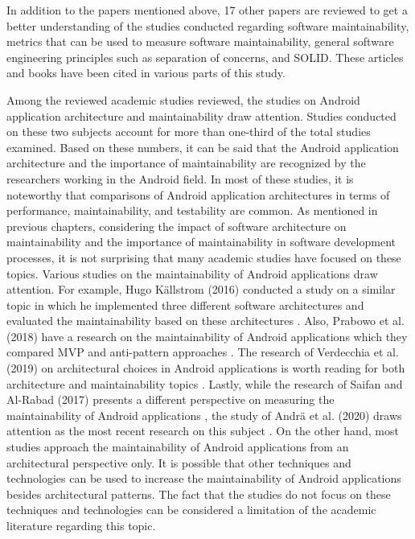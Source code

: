 In addition to the papers mentioned above, 17 other papers are reviewed to get a better understanding of the studies conducted regarding software maintainability, metrics that can be used to measure software maintainability, general software engineering principles such as separation of concerns, and SOLID. These articles and books have been cited in various parts of this study.

Among the reviewed academic studies reviewed, the studies on Android application architecture and maintainability draw attention. Studies conducted on these two subjects account for more than one-third of the total studies examined. Based on these numbers, it can be said that the Android application architecture and the importance of maintainability are recognized by the researchers working in the Android field. In most of these studies, it is noteworthy that comparisons of Android application architectures in terms of performance, maintainability, and testability are common. As mentioned in previous chapters, considering the impact of software architecture on maintainability and the importance of maintainability in software development processes, it is not surprising that many academic studies have focused on these topics. Various studies on the maintainability of Android applications draw attention. For example, Hugo Källstrom (2016) conducted a study on a similar topic in which he implemented three different software architectures and evaluated the maintainability based on these architectures \cite{18}. Also, Prabowo et al. (2018) have a research on the maintainability of Android applications which they compared MVP and anti-pattern approaches \cite{19}. The research of Verdecchia et al. (2019) on architectural choices in Android applications is worth reading for both architecture and maintainability topics \cite{14}. Lastly, while the research of Saifan and Al-Rabad (2017) presents a different perspective on measuring the maintainability of Android applications \cite{34}, the study of Andrä et al. (2020) draws attention as the most recent research on this subject \cite{43}. On the other hand, most studies approach the maintainability of Android applications from an architectural perspective only. It is possible that other techniques and technologies can be used to increase the maintainability of Android applications besides architectural patterns. The fact that the studies do not focus on these techniques and technologies can be considered a limitation of the academic literature regarding this topic.